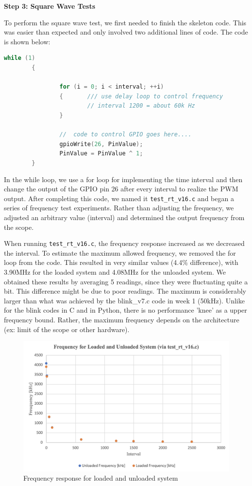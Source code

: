 \documentclass[a4paper,10pt]{article}
\newcommand{\code}[1]{\colorbox{light-gray}{\texttt{#1}}}
\begin{document}
\textbf{Step 3: Square Wave Tests}

To perform the square wave test, we first needed to finish the skeleton code. This was easier than expected and only involved two additional lines of code. The code is shown below:
\begin{center}
\begin{lstlisting}[language=C, label=code:code16] 
while (1)
        {

                for (i = 0; i < interval; ++i)
                {       /// use delay loop to control frequency
                        // interval 1200 = about 60k Hz
                }

                //  code to control GPIO goes here....
                gpioWrite(26, PinValue);
                PinValue = PinValue ^ 1;
        }
\end{lstlisting}
\end{center}\vspace{-1em}
In the while loop, we use a for loop for implementing the time interval and then change the output of the GPIO pin 26 after every interval to realize the PWM output. After completing this code, we named it \code{test\_rt\_v16.c} and began a series of frequency test experiments. Rather than adjusting the frequency, we adjusted an arbitrary value (interval) and determined the output frequency from the scope. 

When running \code{test\_rt\_v16.c}, the frequency response increased as we decreased the interval. To estimate the maximum allowed frequency, we removed the for loop from the code. This resulted in very similar values (4.4\% difference), with 3.90MHz for the loaded system and 4.08MHz for the unloaded system. We obtained these results by averaging 5 readings, since they were fluctuating quite a bit. This difference might be due to poor readings. The maximum is considerably larger than what was achieved by the blink\_v7.c code in week 1 (50kHz). Unlike for the blink codes in C and in Python, there is no performance 'knee' as a upper frequency bound. Rather, the maximum frequency depends on the architecture (ex: limit of the scope or other hardware).  

\begin{figure}[H]
\centering
\includegraphics[width=0.75\linewidth]{Images/test_rt freq.png}
\caption{Frequency response for loaded and unloaded system}
\end{figure}
\end{document}
